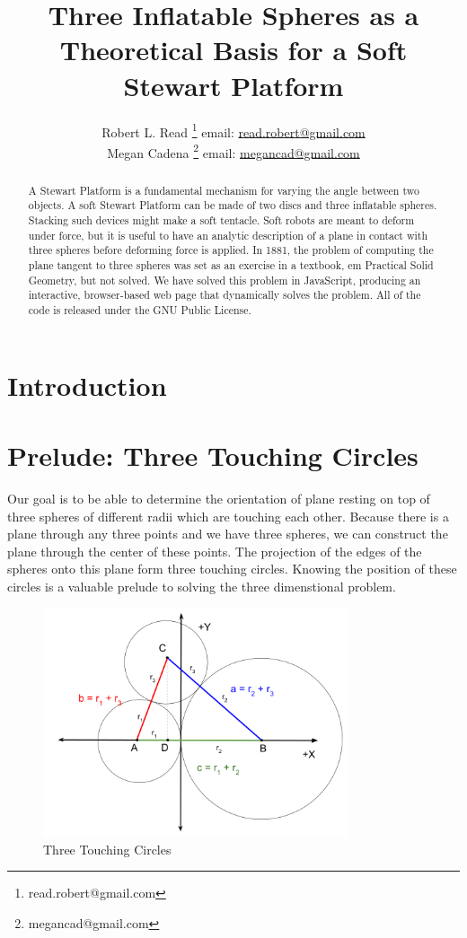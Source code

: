\documentclass{article}
\title{Three Inflatable Spheres as a Theoretical Basis for a Soft Stewart Platform}
\author{Robert L. Read
  \thanks{read.robert@gmail.com}
  email: \href{mailto:read.robert@gmail.com}{read.robert@gmail.com}\\
Megan Cadena
  \thanks{megancad@gmail.com}
  email: \href{mailto:megancad@gmail.com}{megancad@gmail.com}
  }
\begin{document}
\maketitle
\begin{abstract}
  A Stewart Platform\cite{wiki:stewart} is a fundamental mechanism for varying the angle
  between two objects.
  A soft Stewart Platform can be made of two discs and
  three inflatable spheres.
  Stacking such devices might make a soft tentacle.
  Soft robots are meant to deform under force, but it is useful to have
  an analytic description of a plane in contact with three spheres
  before deforming force is applied.
  In 1881, the problem of computing the plane tangent to three spheres was
  set as an exercise in a textbook, {em Practical Solid Geometry}\cite{payne1881},
  but not solved.
  We have solved this problem in JavaScript, producing an interactive,
  browser-based web page that dynamically solves the problem\cite{softrobotcalc}.
  All of the code is released under the GNU Public License.
\end{abstract}


\section{Introduction}


\section{Prelude: Three Touching Circles}

Our goal is to be able to determine the orientation of plane resting
on top of three spheres of different radii which are touching each
other.
Because there is a plane through any three points and we have three spheres, we can construct the plane through
the center of these points.
The projection of the edges of the spheres onto this plane form three touching circles.
Knowing the position of these circles is a valuable prelude to solving the three dimenstional problem.

\begin{figure}
     \centering
     \includegraphics[width=0.80\textwidth]{figures/ThreeTouchingCircles.png}
     \caption{Three Touching Circles}
  \label{fig:Tangent}
\end{figure}
\end{document}
